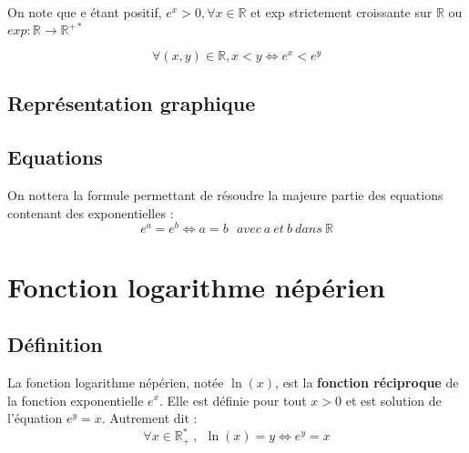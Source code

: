 \documentclass{report}
\begin{document}
    On note que e étant positif, $e^x > 0 , \forall x \in \mathbb{R}$ et exp strictement croissante sur $\mathbb{R}$ ou $exp : \mathbb{R} \rightarrow \mathbb{R}^{+*}$

    \[\forall (x,y) \in \mathbb{R}, x < y \Leftrightarrow e^x < e^y\]

    \subsection{Représentation graphique}

    \begin{center}
    \end{center}

    \subsection{Equations}
    On nottera la formule permettant de résoudre la majeure partie des equations contenant des exponentielles : 
    \[e^a = e^b \Leftrightarrow a = b ~~~ avec~a~et~b~dans~\mathbb{R}\]

    \newpage



    \section{Fonction logarithme népérien}

    \subsection{Définition}

    La fonction logarithme népérien, notée \(\ln(x)\), est la \textbf{fonction réciproque} de la fonction exponentielle \(e^x\). Elle est définie pour tout \(x > 0\)  et est solution de l'équation \(e^y = x\). Autrement dit :
    \[
    \forall x \in \mathbb{R}^*_+ ~,~~ \boxed{\ln(x) = y \iff e^y = x}
    \]
\end{document}
